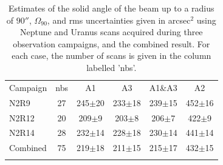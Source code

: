 \documentclass[traditionalabstract]{aa}
\newcommand{\rev}[1]{#1}
\begin{document}
\begin{table}[!h]
\caption{Estimates of the solid angle of the beam up to a radius of
{\rev $90''$, $\Omega_{90}$}, and rms uncertainties given in
arcsec$^{2}$ using Neptune and Uranus scans acquired during three
observation campaigns, and the combined result. For each case, the
number of scans is given in the column labelled 'nbs'.}
\label{tab:solid}
\centering
\begin{tabular}{l ccccc}
\hline\hline
\noalign{\smallskip}
Campaign  & nbs & A1 & A3 & A1\&A3 & A2 \\
\noalign{\smallskip}
\hline
\noalign{\smallskip}
N2R9      & 27  &  245$\pm$20    &  233$\pm$18  & 239$\pm$15  & 452$\pm$16 \\
N2R12     & 20  &  209$\pm$9    &  203$\pm$8 &  206$\pm$7   & 422$\pm$9 \\
N2R14     & 28  &  232$\pm$14    &  228$\pm$18 & 230$\pm$14 & 441$\pm$14 \\
Combined  & 75  &  219$\pm$18    &  211$\pm$15   & 215$\pm$17    &  432$\pm$15 \\
\noalign{\smallskip}
\hline
\end{tabular}
\end{table}

%



\end{document}

